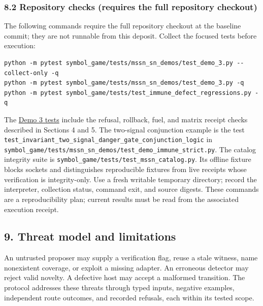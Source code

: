 \documentclass[
  11pt,
]{article}
\begin{document}
\hypertarget{repository-checks-requires-the-full-repository-checkout}{%
\subsubsection{8.2 Repository checks (requires the full repository
checkout)}\label{repository-checks-requires-the-full-repository-checkout}}

The following commands require the full repository checkout at the
baseline commit; they are not runnable from this deposit. Collect the
focused tests before execution:

\begin{lstlisting}
python -m pytest symbol_game/tests/mssn_sn_demos/test_demo_3.py --collect-only -q
python -m pytest symbol_game/tests/mssn_sn_demos/test_demo_3.py -q
python -m pytest symbol_game/tests/test_immune_defect_regressions.py -q
\end{lstlisting}

The
\href{https://github.com/dbccpage/the_symbol_game/blob/52cb5457f6c485ba548cfd292f6012a941ed22cf/symbol_game/tests/mssn_sn_demos/test_demo_3.py}{Demo
3 tests} include the refusal, rollback, fuel, and matrix receipt checks
described in Sections 4 and 5. The two-signal conjunction example is the
test
\texttt{\nolinkurl{test_invariant_two_signal_danger_gate_conjunction_logic}}
in
\texttt{\nolinkurl{symbol_game/tests/mssn_sn_demos/test_demo_immune_strict.py}}.
The catalog integrity suite is
\texttt{\nolinkurl{symbol_game/tests/test_mssn_catalog.py}}.
Its offline fixture blocks sockets and distinguishes reproducible
fixtures from live receipts whose verification is integrity-only. Use a
fresh writable temporary directory; record the interpreter, collection
status, command exit, and source digests. These commands are a
reproducibility plan; current results must be read from the associated
execution receipt.

\hypertarget{threat-model-and-limitations}{%
\subsection{9. Threat model and
limitations}\label{threat-model-and-limitations}}

An untrusted proposer may supply a verification flag, reuse a stale
witness, name nonexistent coverage, or exploit a missing adapter. An
erroneous detector may reject valid novelty. A defective host may accept
a malformed transition. The protocol addresses these threats through
typed inputs, negative examples, independent route outcomes, and
recorded refusals, each within its tested scope.
\end{document}
